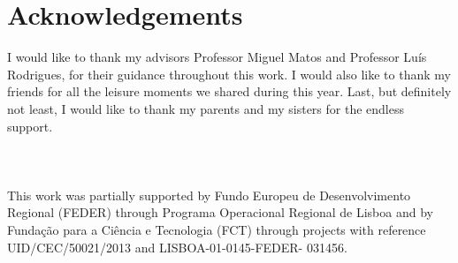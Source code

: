 \chapter*{Acknowledgements}
I would like to thank my advisors Professor Miguel Matos and Professor Luís Rodrigues, for their guidance throughout this work. 
I would also like to thank my friends for all the leisure moments we shared during this year. 
Last, but definitely not least, I would like to thank my parents and my sisters for the endless support.
\\
\\
\\
\\
This work was partially supported by Fundo Europeu de Desenvolvimento Regional (FEDER) through Programa Operacional Regional de Lisboa and by Fundação para a Ciência e Tecnologia (FCT) through projects with reference UID/CEC/50021/2013 and LISBOA-01-0145-FEDER- 031456.